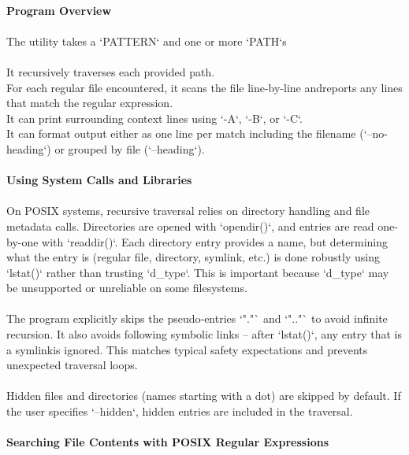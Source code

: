 \documentclass{article}
\begin{document}
\\
{\large \textbf{Program Overview}}\\
\\
{\normalsize The utility takes a `PATTERN` and one or more `PATH`s}\\
\\
{\normalsize It recursively traverses each provided path.}\\
{\normalsize For each regular file encountered, it scans the file line-by-line and}{\normalsize  reports any lines that match the regular expression.}\\
{\normalsize It can print surrounding context lines using `-A`, `-B`, or `-C`.}\\
{\normalsize It can format output either as one line per match including the filename (`--no-heading`) or grouped by file }{\normalsize (`--heading`).}\\
\\
{\large \textbf{Using System Calls and Libraries}}\\
\\
{\normalsize On POSIX systems, recursive traversal relies on directory handling and file metadata calls. Directories are opened with `}{\normalsize opendir}{\normalsize (}{\normalsize )`, and entries are read one-by-one with `}{\normalsize readdir}{\normalsize ()`. Each directory entry pr}{\normalsize ovides a name, but determining what the entry is (regular file, directory, }{\normalsize symlink}{\normalsize , etc.) is done robustly using `}{\normalsize lstat}{\normalsize (}{\normalsize )` rather than trusting `}{\normalsize d\_type}{\normalsize `. This is important because `}{\normalsize d\_type}{\normalsize ` may be unsupported or unreliable on some filesystems.}\\
\\
{\normalsize The program }{\normalsize explicitly skips the pseudo-entries `"."` and `".."` to avoid infinite recursion. It also avoids following symbolic links – after `}{\normalsize lstat}{\normalsize (}{\normalsize )`, any entry that is a }{\normalsize symlink}{\normalsize  is ignored. This matches typical safety expectations and prevents unexpected traversal }{\normalsize loops.}\\
\\
{\normalsize Hidden files and directories (names starting with a dot) are skipped by default. If the user specifies `--hidden`, hidden entries are included in the traversal.}\\
\\
{\large \textbf{Searching File Contents with POSIX Regular Expressions}}\\
\end{document}
